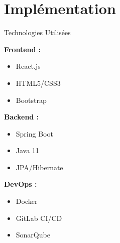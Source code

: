 \documentclass[aspectratio=169]{beamer}
\begin{document}
\section{Implémentation}

\begin{frame}{Technologies Utilisées}
    \begin{multicols}{3}
        \textbf{Frontend :}
        \begin{itemize}
            \item React.js
            \item HTML5/CSS3
            \item Bootstrap
        \end{itemize}

        \textbf{Backend :}
        \begin{itemize}
            \item Spring Boot
            \item Java 11
            \item JPA/Hibernate
        \end{itemize}

        \textbf{DevOps :}
        \begin{itemize}
            \item Docker
            \item GitLab CI/CD
            \item SonarQube
        \end{itemize}
    \end{multicols}
\end{frame}
\end{document}
